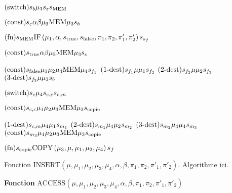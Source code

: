 \begin{appendices}
\begin{algorithm}[H]
			\espace
			
			
			$\text{(switch)} s_{b} \mu_3 s_{\varepsilon} s_{\text{MEM}}$ \;
			
			\espace
			
			$\text{(const)} s_{\varepsilon} \alpha \beta \mu_3 \text{MEM} \mu_3 s_{b}$ \;
			
			\espace
			
			$\text{(fn)} s_{\text{MEM}} \text{IF}\left( \mu_1, \alpha, s_{\text{true}}, s_{\text{false}}, \pi_1, \pi_2, \pi'_1, \pi'_2 \right) s_{s_f} $\;
			
			$\text{(const)} s_{\text{true}} \alpha \beta \mu_3 \text{MEM} \mu_3 s_{c}$ \;
			
			\espace 
			
			$\text{(const)} s_{\text{false}} \mu_1 \mu_2 \mu_4 \text{MEM} \mu_4 s_{f_1}$ \;
			$\text{($1$-dest)} s_{f_1} \mu \mu_1 s_{f_2}$ \;
			$\text{($2$-dest)} s_{f_2} \mu \mu_2 s_{f_3}$ \;
			$\text{($3$-dest)} s_{f_3} \mu \mu_3 s_{b}$ \;
			
			\espace 
			
			
			$\text{(switch)} s_{c} \mu_4 s_{c,\varepsilon} s_{c, m}$ \;
			
			\espace
			
			$\text{(const)} s_{c, \varepsilon} \mu_1 \mu_2 \mu_3 \text{MEM} \mu_3 s_{\text{copie}}$ \;
			
			
			$\text{($1$-dest)} s_{c,m} \mu_4 \mu_1 s_{m_1}$ \;
			$\text{($2$-dest)} s_{m_1} \mu_4 \mu_2 s_{m_2}$ \;
			$\text{($3$-dest)} s_{m_2} \mu_4 \mu_4 s_{m_3}$ \;
			$\text{(const)} s_{m_3} \mu_1 \mu_2 \mu_3 \text{MEM} \mu_3 s_{\text{copie}}$ \;
			
			$\text{(fn)} s_{\text{copie}} \text{COPY}\left( \mu_3, \mu, \mu_1, \mu_2, \mu_4 \right) s_{f}$ \;
			
			\caption{Fonction $\text{INSERT}\left( \mu, \mu_1, \mu_2, \mu_3, \mu_4, \alpha, \beta, \pi_1, \pi_2, \pi'_1, \pi'_2\right)$. Algorithme \hyperref[algo:A_RAM_fn_INSERT]{ici}. }
		\end{algorithm}
		
		\espace
		
		\begin{algorithm}[H]
			\label{prog:A_RAM_fn_ACCESS}
			
			\textbf{Fonction} $\text{ACCESS}\left( \mu, \mu_1, \mu_2, \mu_3, \mu_4, \alpha, \beta, \pi_1, \pi_2, \pi'_1, \pi'_2\right)$
			

\end{algorithm}
\end{appendices}
